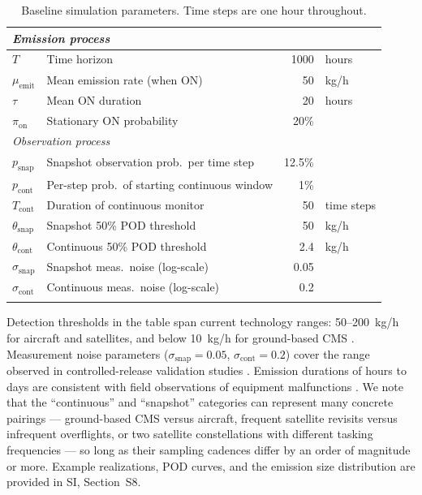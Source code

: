 \documentclass[unnumsec,webpdf,modern,mediumone]{oup-authoring-template}
\newcommand{\new}[1]{{\color{blue}#1}}
\newcommand{\edit}[1]{{\color{magenta}#1}}
\begin{document}
\begin{table}[h]
\centering
\caption{Baseline simulation parameters. \new{Time steps are one hour throughout.}}
\label{tab:baseline_params}
\begin{tabular}{llrl}
\toprule
\multicolumn{4}{l}{\textit{Emission process}} \\
\midrule
$T$ & Time horizon & 1000 & hours \\
$\mu_{\text{emit}}$ & Mean emission rate (when ON) & 50 & kg/h \\
$\tau$ & Mean ON duration & 20 & hours \\
$\pi_{\text{on}}$ & Stationary ON probability & 20\% & \\
\midrule
\multicolumn{4}{l}{\textit{Observation process}} \\
\midrule
$p_{\text{snap}}$ & Snapshot observation prob.\ per time step & \edit{12.5\%} & \\
$p_{\text{cont}}$ & Per-step prob.\ of starting continuous window & 1\% & \\
$T_{\text{cont}}$ & Duration of continuous monitor & 50 & time steps \\
$\theta_{\text{snap}}$ & Snapshot 50\% POD threshold & 50 & kg/h \\
$\theta_{\text{cont}}$ & Continuous 50\% POD threshold & 2.4 & kg/h \\
$\sigma_{\text{snap}}$ & Snapshot meas.\ noise (log-scale) & 0.05 & \\
$\sigma_{\text{cont}}$ & Continuous meas.\ noise (log-scale) & 0.2 & \\
\botrule
\end{tabular}
\end{table}


\edit{Detection thresholds in the table span current technology ranges: 50--200~kg/h for aircraft and satellites, and below 10~kg/h for ground-based CMS \citep{chen2024comparing, Conrad2023, ElAbbadi2024, Sherwin2023}. Measurement noise parameters ($\sigma_{\text{snap}} = 0.05$, $\sigma_{\text{cont}} = 0.2$) cover the range observed in controlled-release validation studies \citep{Sherwin2021, Sherwin2023}. Emission durations of hours to days are consistent with field observations of equipment malfunctions \citep{Cusworth2021, Cusworth2026NatComms, Daniels2024}. We note that the ``continuous'' and ``snapshot'' categories can represent many concrete pairings — ground-based CMS versus aircraft, frequent satellite revisits versus infrequent overflights, or two satellite constellations with different tasking frequencies — so long as their sampling cadences differ by an order of magnitude or more. Example realizations, POD curves, and the emission size distribution are provided in SI, Section~S8.}
\end{document}
